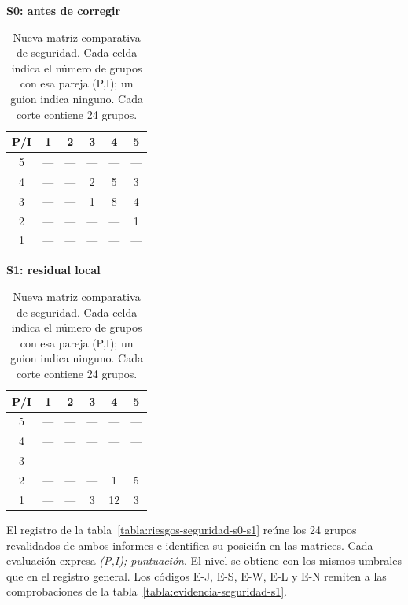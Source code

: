 \begin{table}[H]
	\centering\small
	\begin{minipage}[t]{0.48\textwidth}
		\centering
		\textbf{S0: antes de corregir}\par
		\par\medskip
		\begin{tabular}{c|ccccc}
			\toprule
			\textbf{P/I} & \textbf{1} & \textbf{2} & \textbf{3} & \textbf{4} & \textbf{5} \\
			\midrule
			5 & --- & --- & --- & --- & --- \\
			4 & --- & --- & 2 & 5 & 3 \\
			3 & --- & --- & 1 & 8 & 4 \\
			2 & --- & --- & --- & --- & 1 \\
			1 & --- & --- & --- & --- & --- \\
			\bottomrule
		\end{tabular}
	\end{minipage}\hfill
	\begin{minipage}[t]{0.48\textwidth}
		\centering
		\textbf{S1: residual local}\par
		\par\medskip
		\begin{tabular}{c|ccccc}
			\toprule
			\textbf{P/I} & \textbf{1} & \textbf{2} & \textbf{3} & \textbf{4} & \textbf{5} \\
			\midrule
			5 & --- & --- & --- & --- & --- \\
			4 & --- & --- & --- & --- & --- \\
			3 & --- & --- & --- & --- & --- \\
			2 & --- & --- & --- & 1 & 5 \\
			1 & --- & --- & 3 & 12 & 3 \\
			\bottomrule
		\end{tabular}
	\end{minipage}
	\caption{Nueva matriz comparativa de seguridad. Cada celda indica el número de grupos con esa pareja (P,I); un guion indica ninguno. Cada corte contiene 24 grupos.}
	\label{tabla:matriz-seguridad-s0-s1}
\end{table}

El registro de la tabla~\ref{tabla:riesgos-seguridad-s0-s1} reúne los 24 grupos revalidados de ambos informes e identifica su posición en las matrices. Cada evaluación expresa \emph{(P,I); puntuación}. El nivel se obtiene con los mismos umbrales que en el registro general. Los códigos E-J, E-S, E-W, E-L y E-N remiten a las comprobaciones de la tabla~\ref{tabla:evidencia-seguridad-s1}.

